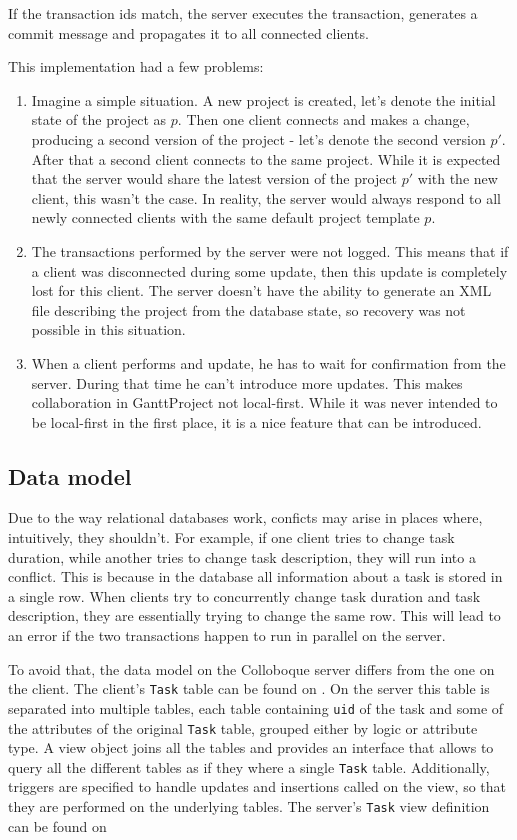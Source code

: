 \documentclass[a4paper, 11pt, oneside]{article}
\theoremstyle{definition}
\begin{document}
If the transaction ids match, the server executes the transaction, generates a commit message and propagates it to all connected clients.

This implementation had a few problems:

\begin{enumerate}
    \item Imagine a simple situation. A new project is created, let's denote the initial state of the project as $p$. Then one client connects and makes a change, producing a second version of the project - let's denote the second version $p'$. After that a second client connects to the same project. While it is expected that the server would share the latest version of the project $p'$ with the new client, this wasn't the case. In reality, the server would always respond to all newly connected clients with the same default project template $p$.
    \item The transactions performed by the server were not logged. This means that if a client was disconnected during some update, then this update is completely lost for this client. The server doesn't have the ability to generate an XML file describing the project from the database state, so recovery was not possible in this situation.
    \item When a client performs and update, he has to wait for confirmation from the server. During that time he can't introduce more updates. This makes collaboration in GanttProject not local-first. While it was never intended to be local-first in the first place, it is a nice feature that can be introduced.
\end{enumerate}

\subsection{Data model}
Due to the way relational databases work, conficts may arise in places where, intuitively, they shouldn't. For example, if one client tries to change task duration, while another tries to change task description, they will run into a conflict. This is because in the database all information about a task is stored in a single row. When clients try to concurrently change task duration and task description, they are essentially trying to change the same row. This will lead to an error if the two transactions happen to run in parallel on the server.

To avoid that, the data model on the Colloboque server differs from the one on the client. The client's \verb|Task| table can be found on . On the server this table is separated into multiple tables, each table containing \verb|uid| of the task and some of the attributes of the original \verb|Task| table, grouped either by logic or attribute type. A view object joins all the tables and provides an interface that allows to query all the different tables as if they where a single \verb|Task| table. Additionally, triggers are specified to handle updates and insertions called on the view, so that they are performed on the underlying tables. The server's \verb|Task| view definition can be found on 
\end{document}
